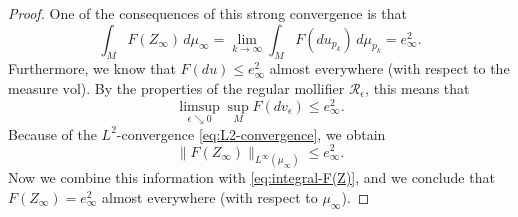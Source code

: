 \documentclass[10pt,a4paper]{amsart}
\newcommand{\vol}{\mathrm{vol}}
\begin{document}
\begin{proof}
One of the consequences of this strong convergence is that
\begin{equation} \label{eq:integral-F(Z)}
\int_M F(Z_\infty) \, d\mu_\infty = \lim_{k \to \infty} \int_M F(du_{p_k}) \, d\mu_{p_k} = e_\infty^2.
\end{equation}
Furthermore, we know that $F(du) \le e_\infty^2$ almost everywhere (with respect to the measure $\vol$). By the properties of the regular mollifier $\mathcal{R}_\epsilon$, this means that
\[
\limsup_{\epsilon \searrow 0} \sup_M F(dv_\epsilon) \le e_\infty^2.
\]
Because of the $L^2$-convergence \eqref{eq:L2-convergence}, we obtain
\[
\|F(Z_\infty)\|_{L^\infty(\mu_\infty)} \le e_\infty^2.
\]
Now we combine this information with \eqref{eq:integral-F(Z)}, and we conclude that $F(Z_\infty) = e_\infty^2$ almost everywhere (with respect to $\mu_\infty$).
\end{proof}
\end{document}
